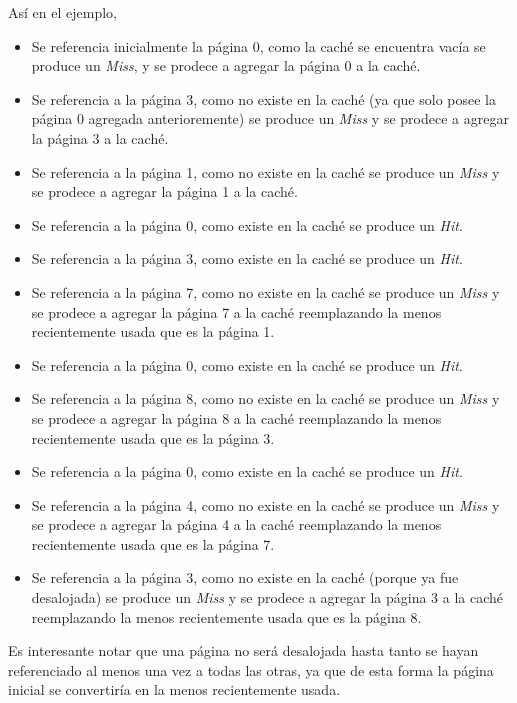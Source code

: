 \documentclass[11pt, a4paper, spanish]{article}
\begin{document}
As\'i en el ejemplo, 
\begin{itemize}
	\item{ Se referencia inicialmente la p\'agina 0, como la cach\'e se encuentra vac\'ia se produce un \textit{Miss}, y se prodece a agregar
		la p\'agina 0 a la cach\'e.}
	\item{ Se referencia a la p\'agina 3, como no existe en la cach\'e (ya que solo posee la p\'agina 0 agregada anterioremente) se produce 
		un \textit{Miss} y se prodece a agregar la p\'agina 3 a la cach\'e.}
	\item{ Se referencia a la p\'agina 1, como no existe en la cach\'e se produce un \textit{Miss} y se prodece a agregar la p\'agina 1 a la cach\'e.}
	\item{ Se referencia a la p\'agina 0, como existe en la cach\'e se produce un \textit{Hit}. }
	\item{ Se referencia a la p\'agina 3, como existe en la cach\'e se produce un \textit{Hit}. }
	\item{ Se referencia a la p\'agina 7, como no existe en la cach\'e se produce un \textit{Miss} y se prodece a agregar la p\'agina 7 a la cach\'e
		reemplazando la menos recientemente usada que es la p\'agina 1. }
	\item{ Se referencia a la p\'agina 0, como existe en la cach\'e se produce un \textit{Hit}. }
	\item{ Se referencia a la p\'agina 8, como no existe en la cach\'e se produce un \textit{Miss} y se prodece a agregar la p\'agina 8 a la cach\'e
		reemplazando la menos recientemente usada que es la p\'agina 3. }
	\item{ Se referencia a la p\'agina 0, como existe en la cach\'e se produce un \textit{Hit}. }
	\item{ Se referencia a la p\'agina 4, como no existe en la cach\'e se produce un \textit{Miss} y se prodece a agregar la p\'agina 4 a la cach\'e
		reemplazando la menos recientemente usada que es la p\'agina 7. }
	\item{ Se referencia a la p\'agina 3, como no existe en la cach\'e (porque ya fue desalojada) se produce un \textit{Miss} y se prodece a agregar 
		la p\'agina 3 a la cach\'e reemplazando la menos recientemente usada que es la p\'agina 8. }
\end{itemize}

Es interesante notar que una p\'agina no ser\'a desalojada hasta tanto se hayan referenciado al menos una vez a todas las otras, ya que de esta forma
la p\'agina inicial se convertiría en la menos recientemente usada.\\
\end{document}
